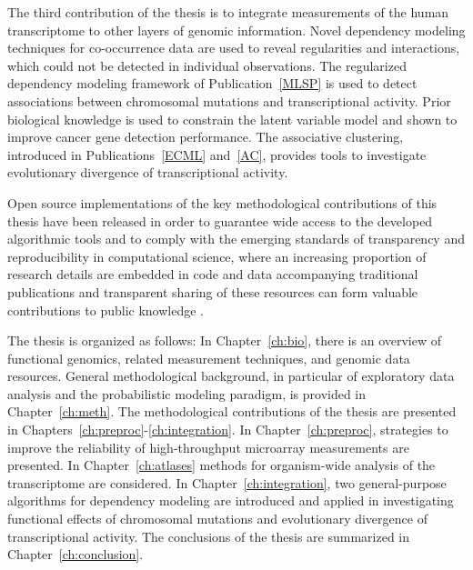 The third contribution of the thesis is to integrate measurements of
the human transcriptome to other layers of genomic information.  Novel
dependency modeling techniques for co-occurrence data are used to
reveal regularities and interactions, which could not be detected in
individual observations. The regularized dependency modeling framework
of Publication~\ref{MLSP} is used to detect associations between
chromosomal mutations and transcriptional activity. Prior biological
knowledge is used to constrain the latent variable model and shown to
improve cancer gene detection performance. The associative clustering,
introduced in Publications~\ref{ECML} and~\ref{AC}, provides tools to
investigate evolutionary divergence of transcriptional activity.

Open source implementations of the key methodological contributions of
this thesis have been released in order to guarantee wide access to
the developed algorithmic tools and to comply with the emerging
standards of transparency and reproducibility in computational
science, where an increasing proportion of research details are
embedded in code and data accompanying traditional publications
\citep{Boulesteix2010, Carey2010, Ioannidis09} and transparent sharing
of these resources can form valuable contributions to public knowledge
\citep{Sommer2010, Sonnenburg2007, Stodden2010}. 

The thesis is organized as follows: In Chapter~\ref{ch:bio}, there is
an overview of functional genomics, related measurement techniques,
and genomic data resources. General methodological background, in
particular of exploratory data analysis and the probabilistic modeling
paradigm, is provided in Chapter~\ref{ch:meth}. The methodological
contributions of the thesis are presented in
Chapters~\ref{ch:preproc}-\ref{ch:integration}.  In
Chapter~\ref{ch:preproc}, strategies to improve the reliability of
high-throughput microarray measurements are presented. In
Chapter~\ref{ch:atlases} methods for organism-wide analysis of the
transcriptome are considered. In Chapter~\ref{ch:integration}, two
general-purpose algorithms for dependency modeling are introduced and
applied in investigating functional effects of chromosomal mutations
and evolutionary divergence of transcriptional activity. The
conclusions of the thesis are summarized in
Chapter~\ref{ch:conclusion}.


